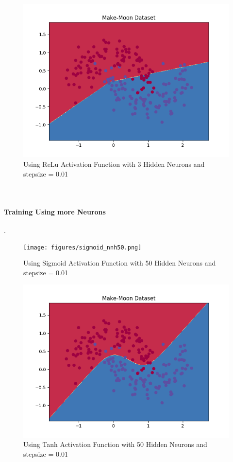 \documentclass{article}
\begin{document}
	\begin{figure}[H]
		\centering
		\includegraphics[width=12cm]{figures/relu.png}
		\caption{Using ReLu Activation Function with 3 Hidden Neurons and stepsize = 0.01}
	\end{figure}
	
\paragraph*{\\ \\Training Using more Neurons}.

	\begin{figure}[H]
		\centering
		\texttt{[image: figures/sigmoid\_nnh50.png]}
		\caption{Using Sigmoid Activation Function with 50 Hidden Neurons and stepsize = 0.01}
	\end{figure}

	\begin{figure}[H]
		\centering
		\includegraphics[width=12cm]{figures/Tanh_nnh50.png}
		\caption{Using Tanh Activation Function with 50 Hidden Neurons and stepsize = 0.01}
	\end{figure}
\end{document}
